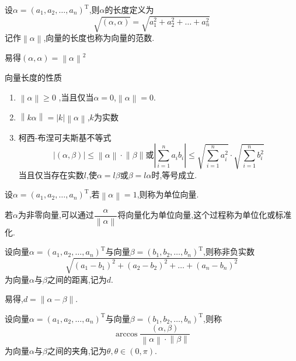 \begin{definition}
    设$\alpha=(a_1,a_2,\dots,a_n)^\mathrm{T}$,则$\alpha$的长度定义为
    \begin{equation*}
        \sqrt{(\alpha,\alpha)}=\sqrt{a_1^2+a_2^2+\dots+a_n^2}
    \end{equation*}
    记作$\left\lVert \alpha \right\rVert $,向量的长度也称为向量的范数.
\end{definition}
易得$(\alpha,\alpha)=\left\lVert \alpha \right\rVert^2 $

向量长度的性质
\begin{enumerate}
    \item $\left\lVert \alpha \right\rVert \geqslant 0$ ,当且仅当$\alpha =0$,$\left\lVert \alpha \right\rVert = 0$.
    \item $\left\lVert k\alpha \right\rVert =\left\lvert k \right\rvert \left\lVert \alpha \right\rVert $,$k$为实数
    \item 柯西-布涅可夫斯基不等式
    \begin{equation*}
        \left\lvert (\alpha,\beta) \right\rvert \leqslant \left\lVert \alpha \right\rVert\cdot \left\lVert \beta \right\rVert\text{或}\left\lvert \sum_{i=1}^{n} a_ib_i\right\rvert \leqslant \sqrt{\sum_{i=1}^{n} a_i^2}\cdot \sqrt{\sum_{i=1}^{n} b_i^2}
    \end{equation*}
    当且仅当存在实数$l$,使$\alpha=l\beta$或$\beta=l\alpha$时,等号成立.
\end{enumerate}

\begin{definition}
    设$\alpha=(a_1,a_2,\dots,a_n)^\mathrm{T}$,若$\left\lVert \alpha\right\rVert =1$,则称为单位向量.
\end{definition}
若$\alpha$为非零向量,可以通过$\dfrac{\alpha}{\left\lVert \alpha \right\rVert }$将向量化为单位向量,这个过程称为单位化或标准化.

\begin{definition}
    设向量$\alpha=(a_1,a_2,\dots,a_n)^\mathrm{T}$与向量$\beta=(b_1,b_2,\dots,b_n)^\mathrm{T}$,则称非负实数
    \begin{equation*}
        \sqrt{(a_1-b_1)^2+(a_2-b_2)^2+\dots+(a_n-b_n)^2}
    \end{equation*}
    为向量$\alpha$与$\beta$之间的距离,记为$d$.
\end{definition}
易得,$d=\left\lVert \alpha-\beta \right\rVert $.

\begin{definition}
    设向量$\alpha=(a_1,a_2,\dots,a_n)^\mathrm{T}$与向量$\beta=(b_1,b_2,\dots,b_n)^\mathrm{T}$,则称
    \begin{equation*}
        \arccos \frac{(\alpha,\beta)}{\left\lVert \alpha\right\rVert \cdot\left\lVert \beta\right\rVert }
    \end{equation*}
    为向量$\alpha$与$\beta$之间的夹角,记为$\theta ,\theta \in (0,\pi)$.
\end{definition}

